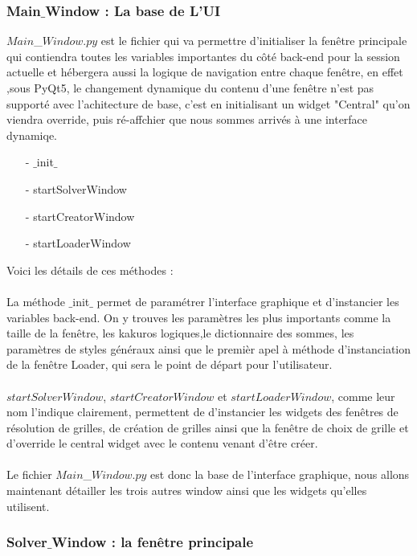 \documentclass[french,12pt]{article}
\begin{document}
\subsubsection{Main$\_$Window : La base de L'UI}

$Main$\_$Window.py$ est le fichier qui va permettre d'initialiser la fenêtre principale qui contiendra toutes les variables importantes du côté back-end pour la session actuelle et hébergera aussi la logique de navigation entre chaque fenêtre, en effet ,sous PyQt5, le changement dynamique du contenu d'une fenêtre n'est pas supporté avec l'achitecture de base, c'est en initialisant un widget "Central" qu'on viendra override, puis ré-affchier que nous sommes arrivés à une interface dynamiqe. \\
\begin{enumerate}
	\item[-] $\_$init$\_$ 
	\item[-] startSolverWindow  
	\item[-] startCreatorWindow 
	\item[-] startLoaderWindow \\
\end{enumerate}
Voici les détails de ces méthodes : \\ \\
La méthode $\_$init$\_$ permet de paramétrer l'interface graphique et d'instancier les variables back-end. On y trouves les paramètres les plus importants comme la taille de la fenêtre, les kakuros logiques,le dictionnaire des sommes, les paramètres de styles généraux ainsi que le premièr apel à méthode d'instanciation de la fenêtre Loader, qui sera le point de départ pour l'utilisateur. \\ \\

$startSolverWindow$, $startCreatorWindow$ et $startLoaderWindow$, comme leur nom l'indique clairement, permettent de d'instancier les widgets des fenêtres de résolution de grilles, de création de grilles ainsi que la fenêtre de choix de grille et d'override le central widget avec le contenu venant d'être créer. \\ \\

Le fichier $Main$\_$Window.py$ est donc la base de l'interface graphique, nous allons maintenant détailler les trois autres window ainsi que les widgets qu'elles utilisent. 




\subsubsection{Solver$\_$Window : la fenêtre principale}
\end{document}
